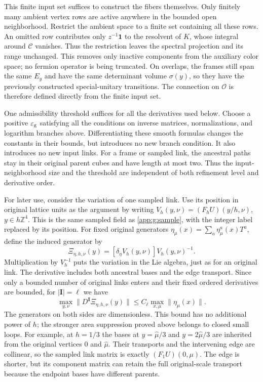 \documentclass[11pt,a4paper]{article}
\theoremstyle{remark}
\newcommand{\Id}{\mathbf 1}
\newcommand{\eps}{\varepsilon}
\begin{document}
This finite input set suffices to construct the fibers themselves. Only finitely many ambient vertex rows
are active anywhere in the bounded open neighborhood. Restrict the
ambient space to a finite set containing all these rows. An omitted row
contributes only $z^{-1}\Id$ to the resolvent of $K$, whose
integral around $\mathcal C$ vanishes. Thus the restriction leaves
the spectral projection and its range unchanged. This removes only
inactive components from the auxiliary color space; no fermion operator
is being truncated. On overlaps, the frames still span the same $E_y$ and have the same determinant volume
$\sigma(y)$, so they have the previously constructed
special-unitary transitions. The connection on $\mathcal O$ is
therefore defined directly from the finite input set.

One admissibility threshold suffices for all the derivatives used below.
Choose a positive $\eps_{\rm g}$ satisfying all the conditions
on inverse matrices, normalizations, and logarithm branches above.
Differentiating these smooth formulas changes the constants in their
bounds, but introduces no new branch condition. It also introduces no
new input links. For a frame or sampled link, the ancestral paths stay
in their original parent cubes and have length at most two. Thus the
input-neighborhood size and the threshold are independent of both
refinement level and derivative order.

For later use, consider the variation of one sampled link. Use its
position in original lattice units as the argument by writing
$V_h(y,\nu)=(F_hU)(y/h,\nu)$, $y\in h\mathbb Z^4$.
This is the same sampled field as \eqref{app:g:sample}, with the integer
label replaced by its position. For fixed original generators
$\eta_\mu(x)=\sum_a\eta_\mu^a(x)T^a$, define the induced
generator by
\begin{equation}
 \Xi_{\eta,h,\nu}(y)
  =[\delta_\eta V_h(y,\nu)]V_h(y,\nu)^{-1}.
\end{equation}
Multiplication by $V_h^{-1}$ puts the variation in the Lie algebra,
just as for an original link. The derivative includes both ancestral
bases and the edge transport. Since only a bounded number of original
links enters and their fixed ordered derivatives are bounded, for
$|\boldsymbol I|=\ell$ we have
\begin{equation}
 \max_{y,\nu}\|D^{\boldsymbol I}\Xi_{\eta,h,\nu}(y)\|
       \le C_\ell\max_{x,\mu}\|\eta_\mu(x)\|.
\end{equation}
The generators on both sides are dimensionless. This bound has no
additional power of $h$; the stronger area suppression proved above
belongs to closed small loops. For example, at $h=1/3$ the bases at
$y=\hat\mu/3$ and $y=2\hat\mu/3$ are inherited from the original
vertices $0$ and $\hat\mu$. Their transports and the intervening edge
are collinear, so the sampled link matrix is exactly $(F_1U)(0,\mu)$.
The edge is shorter, but its component matrix can retain the full
original-scale transport because the endpoint bases have different parents.
\end{document}
